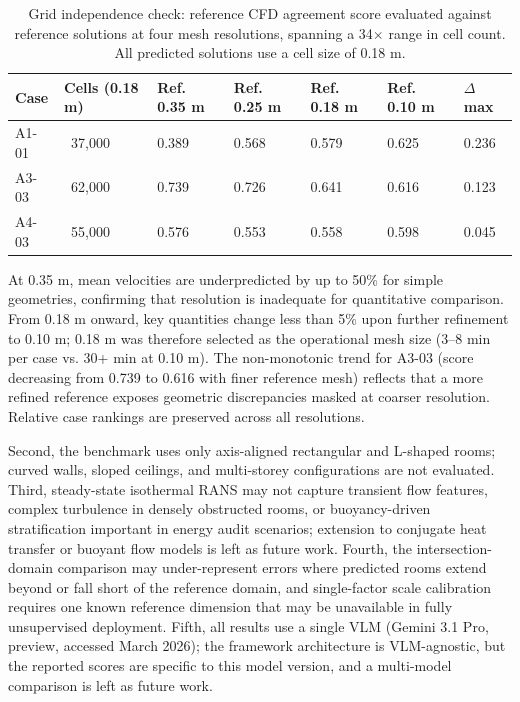 \documentclass[preprint,12pt,number]{elsarticle}
\begin{document}
\begin{table}[htbp]
\centering
\caption{Grid independence check: reference CFD agreement score evaluated against reference solutions at four mesh resolutions, spanning a 34$\times$ range in cell count. All predicted solutions use a cell size of 0.18 m.}
\label{tab:discuss-grid-independence}
\begin{tabular}{lllllll}
\toprule
Case & Cells (0.18 m) & Ref. 0.35 m & Ref. 0.25 m & Ref. 0.18 m & Ref. 0.10 m & $\Delta$ max \\
\midrule
A1-01 & ~37,000 & 0.389 & 0.568 & 0.579 & 0.625 & 0.236 \\
A3-03 & ~62,000 & 0.739 & 0.726 & 0.641 & 0.616 & 0.123 \\
A4-03 & ~55,000 & 0.576 & 0.553 & 0.558 & 0.598 & 0.045 \\
\bottomrule
\end{tabular}
\end{table}


At 0.35 m, mean velocities are underpredicted by up to 50\% for simple geometries, confirming that resolution is inadequate for quantitative comparison. From 0.18 m onward, key quantities change less than 5\% upon further refinement to 0.10 m; 0.18 m was therefore selected as the operational mesh size (3--8 min per case vs. 30+ min at 0.10 m). The non-monotonic trend for A3-03 (score decreasing from 0.739 to 0.616 with finer reference mesh) reflects that a more refined reference exposes geometric discrepancies masked at coarser resolution. Relative case rankings are preserved across all resolutions.

Second, the benchmark uses only axis-aligned rectangular and L-shaped rooms; curved walls, sloped ceilings, and multi-storey configurations are not evaluated. Third, steady-state isothermal RANS may not capture transient flow features, complex turbulence in densely obstructed rooms, or buoyancy-driven stratification important in energy audit scenarios; extension to conjugate heat transfer or buoyant flow models is left as future work. Fourth, the intersection-domain comparison may under-represent errors where predicted rooms extend beyond or fall short of the reference domain, and single-factor scale calibration requires one known reference dimension that may be unavailable in fully unsupervised deployment. Fifth, all results use a single VLM (Gemini 3.1 Pro, preview, accessed March 2026); the framework architecture is VLM-agnostic, but the reported scores are specific to this model version, and a multi-model comparison is left as future work.
\end{document}
